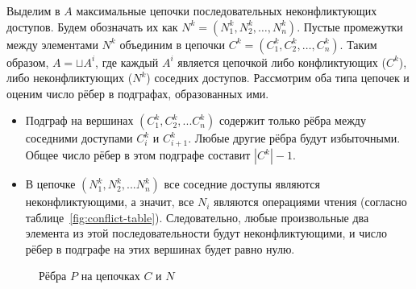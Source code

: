 Выделим в $A$ максимальные цепочки последовательных неконфликтующих доступов. Будем обозначать их как $N^k = (N^k_1, N^k_2, \ldots, N^k_n)$. Пустые промежутки между элементами $N^k$ объединим в цепочки $C^k = (C^k_1, C^k_2, \ldots, C^k_n)$. Таким образом, $A = \sqcup A^i$, где каждый $A^i$ является цепочкой либо конфликтующих ($C^k$), либо неконфликтующих ($N^k$) соседних доступов. Рассмотрим оба типа цепочек и оценим число рёбер в подграфах, образованных ими.

\begin{itemize}
    \item Подграф на вершинах $(C^k_1, C^k_2, ... C^k_n)$ содержит только рёбра между соседними доступами $C^k_i$ и $C^k_{i+1}$. Любые другие рёбра будут избыточными. Общее число рёбер в этом подграфе составит $|C^k| - 1$.
    \item В цепочке $(N^k_1, N^k_2, ... N^k_n)$ все соседние доступы являются неконфликтующими, а значит, все $N_i$ являются операциями чтения (согласно таблице~\ref{fig:conflict-table}). Следовательно, любые произвольные два элемента из этой последовательности будут неконфликтующими, и число рёбер в подграфе на этих вершинах будет равно нулю.
\end{itemize}

\begin{figure}[H]
    \centering
    \caption{Рёбра $P$ на цепочках $C$ и $N$}
\end{figure}

